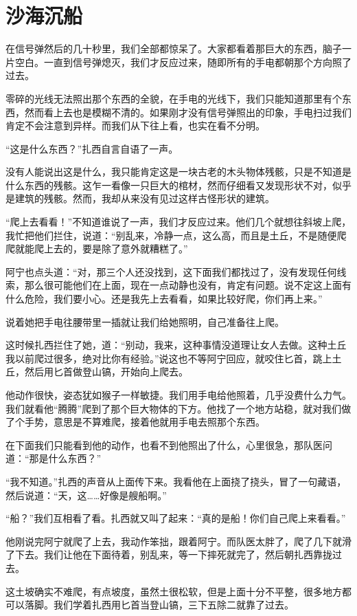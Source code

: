 \chapter{沙海沉船}

在信号弹然后的几十秒里，我们全部都惊呆了。大家都看着那巨大的东西，脑子一片空白。一直到信号弹熄灭，我们才反应过来，随即所有的手电都朝那个方向照了过去。

零碎的光线无法照出那个东西的全貌，在手电的光线下，我们只能知道那里有个东西，然而看上去也是模糊不清的。如果刚才没有信号弹照出的印象，手电扫过我们肯定不会注意到异样。而我们从下往上看，也实在看不分明。

“这是什么东西？”扎西自言自语了一声。

没有人能说出这是什么，我只能肯定这是一块古老的木头物体残骸，只是不知道是什么东西的残骸。这乍一看像一只巨大的棺材，然而仔细看又发现形状不对，似乎是建筑的残骸。然而，我却从来没有见过这样古怪形状的建筑。

“爬上去看看！”不知道谁说了一声，我们才反应过来。他们几个就想往斜坡上爬，我忙把他们拦住，说道：“别乱来，冷静一点，这么高，而且是土丘，不是随便爬爬就能爬上去的，要是除了意外就糟糕了。”

阿宁也点头道：“对，那三个人还没找到，这下面我们都找过了，没有发现任何线索，那么很可能他们在上面，现在一点动静也没有，肯定有问题。说不定这上面有什么危险，我们要小心。还是我先上去看看，如果比较好爬，你们再上来。”

说着她把手电往腰带里一插就让我们给她照明，自己准备往上爬。

这时候扎西拦住了她，道：“别动，我来，这种事情没道理让女人去做。这种土丘我以前爬过很多，绝对比你有经验。”说这也不等阿宁回应，就咬住匕首，跳上土丘，然后用匕首做登山镐，开始向上爬去。

他动作很快，姿态犹如猴子一样敏捷。我们用手电给他照着，几乎没费什么力气。我们就看他“腾腾”爬到了那个巨大物体的下方。他找了一个地方站稳，就对我们做了个手势，意思是不算难爬，接着他就用手电去照那个东西。

在下面我们只能看到他的动作，也看不到他照出了什么，心里很急，那队医问道：“那是什么东西？”

“我不知道。”扎西的声音从上面传下来。我看他在上面挠了挠头，冒了一句藏语，然后说道：“天，这……好像是艘船啊。”

“船？”我们互相看了看。扎西就又叫了起来：“真的是船！你们自己爬上来看看。”

他刚说完阿宁就爬了上去，我动作笨拙，跟着阿宁。而队医太胖了，爬了几下就滑了下去。我们让他在下面待着，别乱来，等一下摔死就完了，然后朝扎西靠拢过去。

这土坡确实不难爬，有点坡度，虽然土很松软，但是上面十分不平整，很多地方都可以落脚。我们学着扎西用匕首当登山镐，三下五除二就靠了过去。

